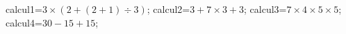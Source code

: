 \documentclass[exercice]{thedocument}%
\begin{document}
%
    \>calcul1=$3\times(2+(2+1)\div3)$;%
    \>calcul2=$3+7\times3+3$;%
    \>calcul3=$7\times4\times5\times5$;%
    \>calcul4=$30-15+15$;%
\end{document}

